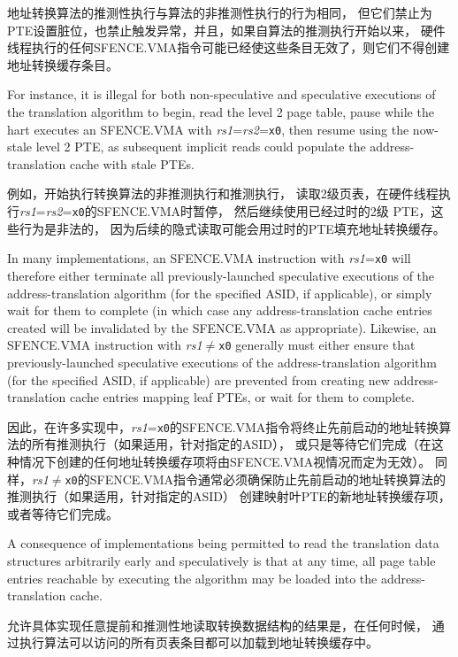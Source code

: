 地址转换算法的推测性执行与算法的非推测性执行的行为相同，
但它们禁止为PTE设置脏位，也禁止触发异常，并且，如果自算法的推测执行开始以来，
硬件线程执行的任何SFENCE.VMA指令可能已经使这些条目无效了，则它们不得创建地址转换缓存条目。

\begin{commentary}
  For instance, it is illegal for both non-speculative and speculative
  executions of the translation algorithm to begin, read the level 2 page table,
  pause while the hart executes an SFENCE.VMA with {\em rs1}={\em rs2}={\tt x0},
  then resume using the now-stale level 2 PTE, as subsequent implicit reads
  could populate the address-translation cache with stale PTEs.

  例如，开始执行转换算法的非推测执行和推测执行，
  读取2级页表，在硬件线程执行{\em rs1}={\em rs2}={\tt x0}的SFENCE.VMA时暂停，
  然后继续使用已经过时的2级 PTE，这些行为是非法的，
  因为后续的隐式读取可能会用过时的PTE填充地址转换缓存。

  In many implementations, an SFENCE.VMA instruction with {\em rs1}={\tt x0}
  will therefore either terminate all previously-launched speculative
  executions of the address-translation algorithm (for the specified ASID, if
  applicable), or simply wait for them to complete (in which case any
  address-translation cache entries created will be invalidated by the
  SFENCE.VMA as appropriate).  Likewise, an SFENCE.VMA instruction with {\em
  rs1}$\neq${\tt x0} generally must either ensure that previously-launched
  speculative executions of the address-translation algorithm (for the specified
  ASID, if applicable) are prevented from creating new address-translation cache
  entries mapping leaf PTEs, or wait for them to complete.

  因此，在许多实现中，{\em rs1}={\tt x0}的SFENCE.VMA指令将终止先前启动的地址转换算法的所有推测执行（如果适用，针对指定的ASID），
  或只是等待它们完成（在这种情况下创建的任何地址转换缓存项将由SFENCE.VMA视情况而定为无效）。
  同样，{\em rs1}$\neq${\tt x0}的SFENCE.VMA指令通常必须确保防止先前启动的地址转换算法的推测执行（如果适用，针对指定的ASID）
  创建映射叶PTE的新地址转换缓存项，或者等待它们完成。

  A consequence of implementations being permitted to read the translation data
  structures arbitrarily early and speculatively is that at any time, all
  page table entries reachable by executing the algorithm may be loaded into
  the address-translation cache.

  允许具体实现任意提前和推测性地读取转换数据结构的结果是，在任何时候，
  通过执行算法可以访问的所有页表条目都可以加载到地址转换缓存中。


\end{commentary}
